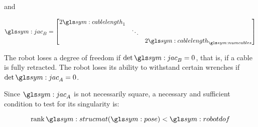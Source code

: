 		and

		\begin{equation}
			\jac_B =
				\left[
					\begin{matrix}
						2\cablelength_1 & & \\
						& \ddots & \\
						& & 2\cablelength_{\numcables}
					\end{matrix}
				\right]
		\end{equation}

		The robot loses a degree of freedom if
		\(
			\det\jac_B = 0
		\), that is, if a cable is fully retracted. The robot loses its ability
		to withstand certain wrenches if
		\(
			\det\jac_A = 0
		\).

		Since $\jac_A$ is not necessarily square, a necessary and sufficient
		condition to test for its singularity is:

		\begin{equation}
			\rank \strucmat(\pose) < \robotdof
		\end{equation}

%
%
%
%
%
%
%
%
